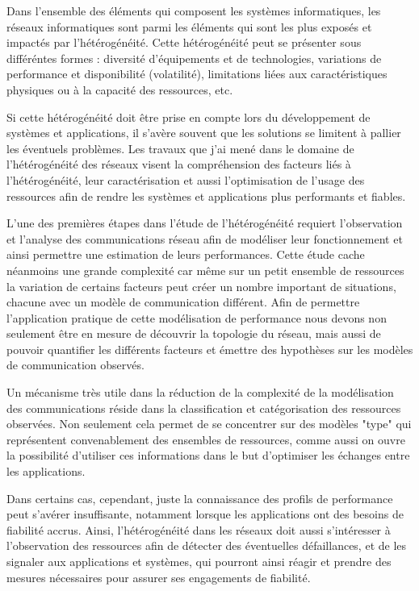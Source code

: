 \begin{resume}
Dans l'ensemble des éléments qui composent les systèmes informatiques, les réseaux informatiques sont parmi les éléments qui sont les plus exposés et impactés par l'hétérogénéité. Cette hétérogénéité peut se présenter sous différéntes formes : diversité d'équipements et de technologies, variations de performance et disponibilité (volatilité), limitations liées aux caractéristiques physiques ou à la capacité des ressources, etc. 

Si cette hétérogénéité doit être prise en compte lors du développement de systèmes et applications, il s'avère souvent que les solutions se limitent à pallier les éventuels problèmes. Les travaux que j'ai mené dans le domaine de l'hétérogénéité des réseaux visent la compréhension des facteurs liés à l'hétérogénéité, leur caractérisation et aussi l'optimisation de l'usage des ressources afin de rendre les systèmes et applications plus performants et fiables.

L'une des premières étapes dans l'étude de l'hétérogénéité requiert l'observation et l'analyse des communications réseau afin de modéliser leur fonctionnement et ainsi permettre une estimation de leurs performances. Cette étude cache néanmoins une grande complexité car même sur un petit ensemble de ressources la variation de certains facteurs peut créer un nombre important de situations, chacune avec un modèle de communication différent. Afin de permettre l'application pratique de cette modélisation de performance nous devons non seulement être en mesure de découvrir la topologie du réseau, mais aussi de pouvoir quantifier les différents facteurs et émettre des hypothèses sur les modèles de communication observés. 

Un mécanisme très utile dans la réduction de la complexité de la modélisation des communications réside dans la classification et catégorisation des ressources observées. Non seulement cela permet de se concentrer sur des modèles "type" qui représentent convenablement des ensembles de ressources, comme aussi on ouvre la possibilité d'utiliser ces informations dans le but d'optimiser les échanges entre les applications.

Dans certains cas, cependant, juste la connaissance des profils de performance peut s'avérer insuffisante, notamment lorsque les applications ont des besoins de fiabilité accrus. Ainsi, l'hétérogénéité dans les réseaux doit aussi s'intéresser à l'observation des ressources afin de détecter des éventuelles défaillances, et de les signaler aux applications et systèmes, qui pourront ainsi réagir et prendre des mesures nécessaires pour assurer ses engagements de fiabilité. 


\end{resume}
